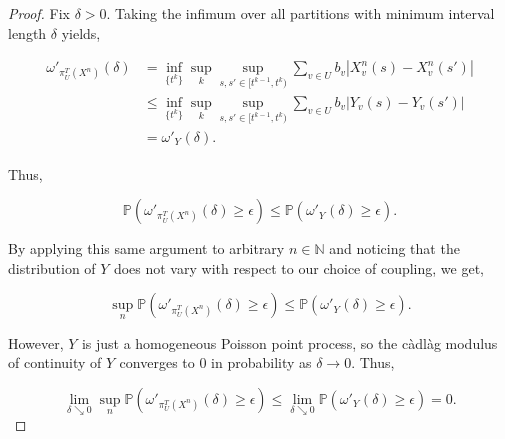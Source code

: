 \documentclass[12pt]{article}
\newcommand{\mb}{\mathbb}
\newcommand{\ra}{\rightarrow}
\newcommand{\ep}{\epsilon}
\newcommand{\pr}{\mb{P}}							%
\renewcommand{\v}{v}							%
\renewcommand{\U}{U}							%
\renewcommand{\b}[1]{b_{#1}}					%
\newcommand{\T}{T}								%
\renewcommand{\t}{t}							%
\newcommand{\pup}[1]{^{#1}}							%
\renewcommand{\tt}{s}								%
\newcommand{\ttt}{s'}								%
\renewcommand{\it}{k}								%
\newcommand{\numb}{n}								%
\newcommand{\piV}[2]{\pi_{#1}^{#2}}					%
\newcommand{\rxvtn}[3]{X_{#1}^{#3}(#2)}				%
\newcommand{\rxvtt}[2]{Y_{#1}{(#2)}}				%
\newcommand{\rxvtsn}[3]{X_{#1}^{#3}{#2}}			%
\newcommand{\rxvtts}[2]{Y_{#1}{#2}}					%
\begin{document}
\begin{proof}
Fix \(\delta > 0\). Taking the infimum over all partitions with minimum interval length \(\delta\) yields,

\begin{align*}
\omega'_{\piV{\U}{\T}\left(\rxvtsn{}{}{\numb}\right)}(\delta) &= \inf_{\{\t\pup{\it}\}}\sup_\it\sup_{\tt,\ttt \in [\t\pup{\it-1},\t\pup{\it})} \sum_{\v\in \U} \b{\v}|\rxvtn{\v}{\tt}{\numb} - \rxvtn{\v}{\ttt}{\numb}|\\
&\leq \inf_{\{\t\pup{\it}\}}\sup_\it\sup_{\tt,\ttt \in [\t\pup{\it-1},\t\pup{\it})} \sum_{\v\in \U} \b{\v}|\rxvtt{\v}{\tt} - \rxvtt{\v}{\ttt}|\\
&= \omega'_{\rxvtts{}{}}(\delta).
\end{align*}

Thus,

\[\pr\left(\omega'_{\piV{\U}{\T}\left(\rxvtsn{}{}{\numb}\right)}(\delta) \geq \ep\right) \leq \pr\left(\omega'_{\rxvtts{}{}}(\delta) \geq \ep\right).\]

By applying this same argument to arbitrary \(\numb\in \mb{N}\) and noticing that the distribution of \(\rxvtts{}{}\) does not vary with respect to our choice of coupling, we get,

\[\sup_{\numb}\pr\left(\omega'_{\piV{\U}{\T}\left(\rxvtsn{}{}{\numb}\right)}(\delta)\geq \ep\right) \leq \pr\left(\omega'_{\rxvtts{}{}}(\delta) \geq \ep\right).\]

However, \(\rxvtts{}{}\) is just a homogeneous Poisson point process, so the c\`adl\`ag modulus of continuity of \(\rxvtts{}{}\) converges to 0 in probability as \(\delta \ra 0\). Thus,

\[\lim_{\delta \searrow 0}\sup_{\numb}\pr\left(\omega'_{\piV{\U}{\T}\left(\rxvtsn{}{}{\numb}\right)}(\delta) \geq \ep\right) \leq \lim_{\delta\searrow 0}\pr\left(\omega'_{\rxvtts{}{}}(\delta)\geq \ep\right) = 0.\]


\end{proof}

\newpage


\end{document}
